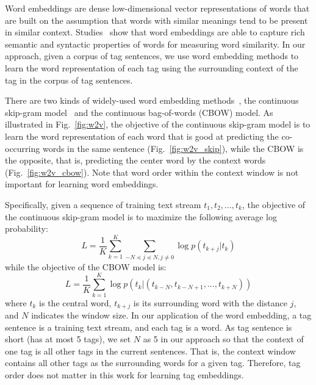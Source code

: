 Word embeddings are dense low-dimensional vector representations of words that are built on the assumption that words with similar meanings tend to be present in similar context.
Studies~\cite{chen2016mining, mikolov2013efficient} show that word embeddings are able to capture rich semantic and syntactic properties of words for measuring word similarity.
In our approach, given a corpus of tag sentences, we use word embedding methods to learn the word representation of each tag using the surrounding context of the tag in the corpus of tag sentences.


There are two kinds of widely-used word embedding methods~\cite{mikolov2013efficient}, the continuous skip-gram model~\cite{mikolov2013distributed} and the continuous bag-of-words (CBOW) model.
As illustrated in Fig.~\ref{fig:w2v}, the objective of the continuous skip-gram model is to learn the word representation of each word that is good at predicting the co-occurring words in the same sentence (Fig.~\ref{fig:w2v_skip}), while the CBOW is the opposite, that is, predicting the center word by the context words (Fig.~\ref{fig:w2v_cbow}).
Note that word order within the context window is not important for learning word embeddings.

Specifically, given a sequence of training text stream $t_{1}, t_{2}, ..., t_{k}$, the objective of the continuous skip-gram model is to maximize the following average log probability:
\begin{equation}
L = \frac{1}{K}\sum_{k=1}^{K} \sum_{-N\preceq j \preceq N, j\neq0} \log p(t_{k+j}|t_{k})
\label{equ:condition_skip}
\end{equation}
while the objective of the CBOW model is:
\begin{equation}
L = \frac{1}{K}\sum_{k=1}^{K} \log p(t_{k}|(t_{k-N}, t_{k-N+1}, ..., t_{k+N}) )
\label{equ:condition_cbow}
\end{equation}
where $t_{k}$ is the central word, $t_{k+j}$ is its surrounding word with the distance $j$, and $N$ indicates the window size.
In our application of the word embedding, a tag sentence is a training text stream, and each tag is a word.
As tag sentence is short (has at most 5 tags), we set $N$ as 5 in our approach so that the context of one tag is all other tags in the current sentences.
That is, the context window contains all other tags as the surrounding words for a given tag.
Therefore, tag order does not matter in this work for learning tag embeddings.

